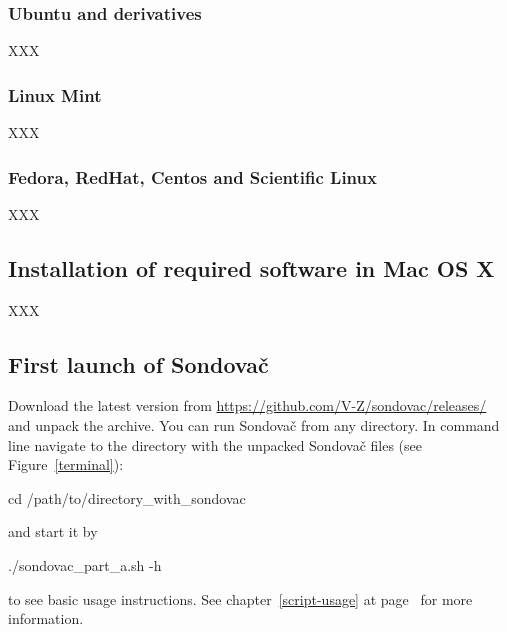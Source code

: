 \documentclass[a4paper, 11pt, twoside]{article}
\begin{document}
\subsubsection{Ubuntu and derivatives}

XXX

\subsubsection{Linux Mint}

XXX

\subsubsection{Fedora, RedHat, Centos and Scientific Linux}

XXX

\subsection{Installation of required software in Mac OS X}

XXX

\subsection{First launch of Sondovač}
\label{script-start}

Download the latest version from \href{https://github.com/V-Z/sondovac/releases/}{https://github.com/V-Z/sondovac/releases/} and unpack the archive. You can run Sondovač from any directory. In command line navigate to the directory with the unpacked Sondovač files (see Figure~\ref{terminal}):

\begin{bashcode}
  cd /path/to/directory_with_sondovac
\end{bashcode}

and start it by

\begin{bashcode}
  ./sondovac_part_a.sh -h
\end{bashcode}

to see basic usage instructions. See chapter~\ref{script-usage} at page~\pageref{script-usage} for more information.
\end{document}

